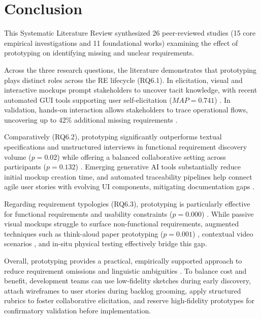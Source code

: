 \section{Conclusion}
\label{sec:conclusion}

This Systematic Literature Review synthesized 26 peer-reviewed studies (15 core empirical investigations and 11 foundational works) examining the effect of prototyping on identifying missing and unclear requirements. 

Across the three research questions, the literature demonstrates that prototyping plays distinct roles across the RE lifecycle (RQ6.1). In elicitation, visual and interactive mockups prompt stakeholders to uncover tacit knowledge, with recent automated GUI tools supporting user self-elicitation ($MAP = 0.741$) \cite{kolthoff2024selfelicitation}. In validation, hands-on interaction allows stakeholders to trace operational flows, uncovering up to 42\% additional missing requirements \cite{rej2022evolve}.

Comparatively (RQ6.2), prototyping significantly outperforms textual specifications and unstructured interviews in functional requirement discovery volume ($p = 0.02$) \cite{rueda2020requirements} while offering a balanced collaborative setting across participants ($p = 0.132$) \cite{diaz2021gender}. Emerging generative AI tools \cite{wei2023boosting} substantially reduce initial mockup creation time, and automated traceability pipelines \cite{kolthoff2024interlinking} help connect agile user stories with evolving UI components, mitigating documentation gaps \cite{inayat2015systematic}.

Regarding requirement typologies (RQ6.3), prototyping is particularly effective for functional requirements and usability constraints ($p = 0.000$) \cite{uv2023empirical}. While passive visual mockups struggle to surface non-functional requirements, augmented techniques such as think-aloud paper prototyping ($p = 0.001$) \cite{abad2018loud}, contextual video scenarios \cite{bano2023videos}, and in-situ physical testing \cite{hoffmann2011automotive} effectively bridge this gap.

Overall, prototyping provides a practical, empirically supported approach to reduce requirement omissions and linguistic ambiguities \cite{berry2003contract}. To balance cost and benefit, development teams can use low-fidelity sketches during early discovery, attach wireframes to user stories during backlog grooming, apply structured rubrics \cite{lending2022rubric} to foster collaborative elicitation, and reserve high-fidelity prototypes for confirmatory validation before implementation.
